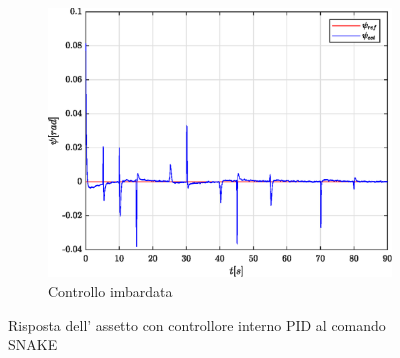 \begin{figure}
	\hfill
	\begin{subfigure}{0.45\textwidth}
		\centering
		\includegraphics[width=1\textwidth]{Simulazioni/Figure/PID/SNAKE/AttitudeControlYaw}
		\caption{Controllo imbardata}
		\label{fig:SNAKEerryawPID}
	\end{subfigure}
	\caption{Risposta dell' assetto con controllore interno PID al comando SNAKE}
\end{figure}

